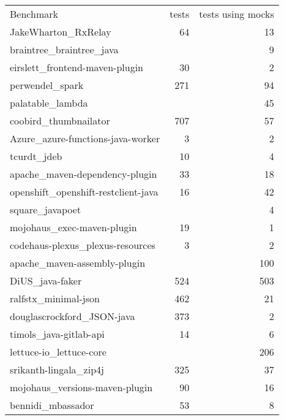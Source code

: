 \begin{table}[]
    \begin{tabular}{lrr}
        Benchmark                            & tests & tests using mocks \\
        JakeWharton\_RxRelay                 & 64    & 13                \\
        braintree\_braintree\_java           &       & 9                 \\
        eirslett\_frontend-maven-plugin      & 30    & 2                 \\
        perwendel\_spark                     & 271   & 94                \\
        palatable\_lambda                    &       & 45                \\
        coobird\_thumbnailator               & 707   & 57                \\
        Azure\_azure-functions-java-worker   & 3     & 2                 \\
        tcurdt\_jdeb                         & 10    & 4                 \\
        apache\_maven-dependency-plugin      & 33    & 18                \\
        openshift\_openshift-restclient-java & 16    & 42                \\
        square\_javapoet                     &       & 4                 \\
        mojohaus\_exec-maven-plugin          & 19    & 1                 \\
        codehaus-plexus\_plexus-resources    & 3     & 2                 \\
        apache\_maven-assembly-plugin        &       & 100               \\
        DiUS\_java-faker                     & 524   & 503               \\
        ralfstx\_minimal-json                & 462   & 21                \\
        douglascrockford\_JSON-java          & 373   & 2                 \\
        timols\_java-gitlab-api              & 14    & 6                 \\
        lettuce-io\_lettuce-core             &       & 206               \\
        srikanth-lingala\_zip4j              & 325   & 37                \\
        mojohaus\_versions-maven-plugin      & 90    & 16                \\
        bennidi\_mbassador                   & 53    & 8
    \end{tabular}
\end{table}

